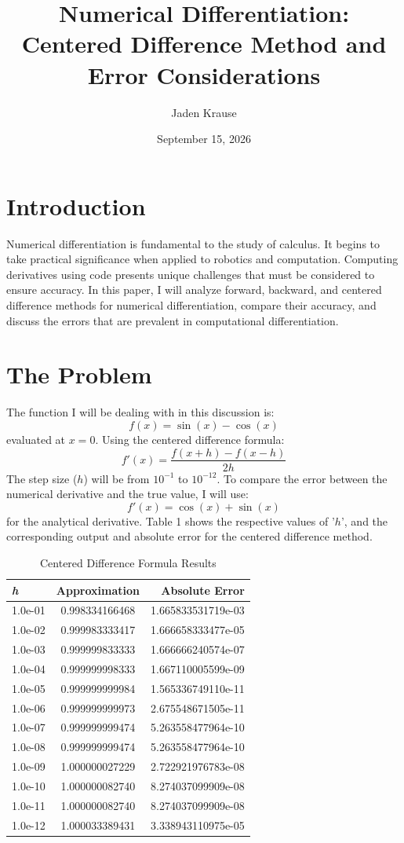 \documentclass{article}
\title{Numerical Differentiation: Centered Difference Method and Error Considerations}
\author{Jaden Krause}
\date{September 15, 2026}
\begin{document}
\maketitle

\section{Introduction}

Numerical differentiation is fundamental to the study of calculus. It begins to take practical significance
when applied to robotics and computation. Computing derivatives using code presents unique challenges that 
must be considered to ensure accuracy. In this paper, I will analyze forward, backward, and centered difference 
methods for numerical differentiation, compare their accuracy, and discuss the errors that are prevalent in 
computational differentiation.

\section{The Problem}

The function I will be dealing with in this discussion is:
$$ f(x) = \sin(x) - \cos(x) $$
evaluated at $ x = 0 $. Using the centered difference formula:
$$ f'(x) = \frac{f(x + h) - f(x - h)}{2h} $$
The step size ($h$) will be from $10^{-1}$ to $10^{-12}$.
To compare the error between the numerical derivative and the true value, I will use:
$$ f'(x) = \cos(x) + \sin(x) $$ 
for the analytical derivative. Table 1 shows the respective values of '$h$', and the corresponding output and 
absolute error for the centered difference method.

\begin{table}
\centering
\begin{tabular}{|l|c|r|}
\hline
\textbf{\textit{h}} & \textbf{Approximation} & \textbf{Absolute Error} \\ \hline
1.0e-01 & 0.998334166468 & 1.665833531719e-03 \\
1.0e-02 & 0.999983333417 & 1.666658333477e-05 \\
1.0e-03 & 0.999999833333 & 1.666666240574e-07 \\
1.0e-04 & 0.999999998333 & 1.667110005599e-09 \\
1.0e-05 & 0.999999999984 & 1.565336749110e-11 \\
1.0e-06 & 0.999999999973 & 2.675548671505e-11 \\
1.0e-07 & 0.999999999474 & 5.263558477964e-10 \\
1.0e-08 & 0.999999999474 & 5.263558477964e-10 \\
1.0e-09 & 1.000000027229 & 2.722921976783e-08 \\
1.0e-10 & 1.000000082740 & 8.274037099909e-08 \\
1.0e-11 & 1.000000082740 & 8.274037099909e-08 \\
1.0e-12 & 1.000033389431 & 3.338943110975e-05 \\ \hline
\end{tabular}
\caption{Centered Difference Formula Results}
\label{tab:centered_difference_formula_results}
\end{table}
\end{document}
